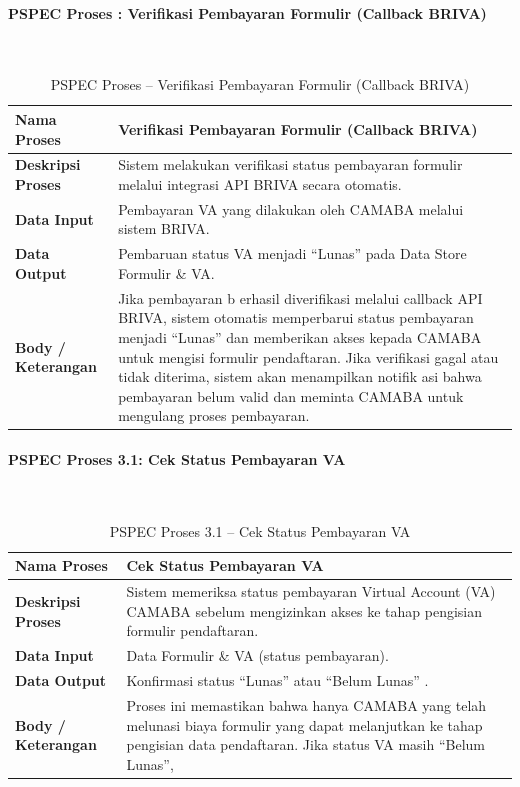 \paragraph{PSPEC Proses : Verifikasi Pembayaran Formulir (Callback BRIVA)}~\\
\begin{longtable}{|p{}|p{}|}
	\caption{PSPEC Proses  -- Verifikasi Pembayaran Formulir (Callback BRIVA)}
	\label{table:3.pspec}\\
	\hline
	\textbf{Nama Proses} & Verifikasi Pembayaran Formulir (Callback BRIVA) \\
	\hline
	\textbf{Deskripsi Proses} & Sistem melakukan verifikasi status pembayaran formulir melalui integrasi API BRIVA secara otomatis. \\
	\hline
	\textbf{Data Input} & Pembayaran VA yang dilakukan oleh CAMABA melalui sistem BRIVA. \\
	\hline
	\textbf{Data Output} & Pembaruan status VA menjadi “Lunas” pada Data Store Formulir \& VA. \\
	\hline
	\textbf{Body / Keterangan} & Jika pembayaran b erhasil diverifikasi melalui callback API BRIVA, sistem otomatis memperbarui status pembayaran menjadi “Lunas” dan memberikan akses kepada CAMABA untuk mengisi formulir pendaftaran. Jika verifikasi gagal atau tidak diterima, sistem akan menampilkan notifik asi bahwa pembayaran belum valid dan meminta CAMABA untuk mengulang proses pembayaran. \\
	\hline
\end{longtable}


\paragraph{PSPEC Proses 3.1: Cek Status Pembayaran VA}~\\
\begin{longtable}{|p{}|p{}|}
	\caption{PSPEC Proses 3.1 -- Cek Status Pembayaran VA}
	\label{table:3.pspec31}\\
	\hline
	\textbf{Nama Proses} & Cek Status Pembayaran VA \\
	\hline
	\textbf{Deskripsi Proses} & Sistem memeriksa status pembayaran Virtual Account (VA) CAMABA sebelum mengizinkan akses ke tahap pengisian formulir pendaftaran. \\
	\hline
	\textbf{Data Input} & Data Formulir \& VA (status pembayaran). \\
	\hline
	\textbf{Data Output} & Konfirmasi status “Lunas” atau “Belum Lunas” . \\
	\hline
	\textbf{Body / Keterangan} & Proses ini memastikan bahwa hanya CAMABA yang telah melunasi biaya formulir yang dapat melanjutkan ke tahap pengisian data pendaftaran. Jika status VA masih “Belum Lunas”, \\
	\hline
\end{longtable}


